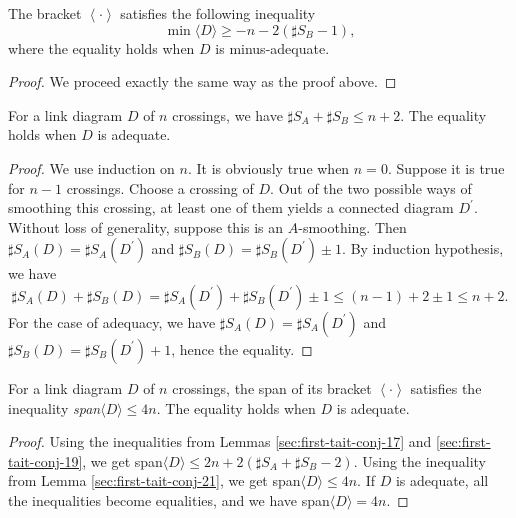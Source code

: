 \begin{lemma}
\label{sec:first-tait-conj-19}
The bracket $\left< \cdot \right>$ satisfies the following inequality
\begin{displaymath}
\min \langle D \rangle \geq -n - 2(\sharp S_B - 1),
\end{displaymath}
where the equality holds when $D$ is minus-adequate.
\end{lemma}

\begin{proof}
\label{sec:first-tait-conj-20}
We proceed exactly the same way as the proof above.
\end{proof}

\begin{lemma}
\label{sec:first-tait-conj-21}
For a link diagram $D$ of $n$ crossings, we have $\sharp S_A + \sharp S_B \leq n+2$. The equality holds when $D$ is adequate.
\end{lemma}

\begin{proof}
\label{sec:first-tait-conj-22}
We use induction on $n$. It is obviously true when $n=0$. Suppose it is true for $n-1$ crossings. Choose a crossing of $D$. Out of the two possible ways of smoothing this crossing, at least one of them yields a connected diagram $D^{\prime}$. Without loss of generality, suppose this is an $A$-smoothing. Then $\sharp S_A(D) = \sharp S_A(D^{\prime})$ and $\sharp S_B(D) = \sharp S_B (D^{\prime}) \pm 1$. By induction hypothesis, we have 
\begin{displaymath}
\sharp S_A(D) + \sharp S_B(D) = \sharp S_A(D^{\prime}) + \sharp S_B(D^{\prime}) \pm 1 \leq (n-1) + 2 \pm 1 \leq n + 2.
\end{displaymath}
For the case of adequacy, we have $\sharp S_A(D) = \sharp S_A(D^{\prime})$ and $\sharp S_B(D) = \sharp S_B (D^{\prime}) + 1$, hence the equality.
\end{proof}


\begin{lemma}
\label{sec:first-tait-conj-7}
For a link diagram $D$ of $n$ crossings, the span of its bracket $\left< \cdot \right>$ satisfies the inequality \emph{span}$\langle D \rangle \leq 4n$. The equality holds when $D$ is adequate.
\end{lemma}

\begin{proof}
\label{sec:first-tait-conj-8}
Using the inequalities from Lemmas \ref{sec:first-tait-conj-17} and \ref{sec:first-tait-conj-19}, we get span$\langle D \rangle \leq 2n + 2(\sharp S_A + \sharp S_B- 2) $. Using the inequality from Lemma \ref{sec:first-tait-conj-21}, we get span$\langle D \rangle \leq 4n$. If $D$ is adequate, all the inequalities become equalities, and we have span$\langle D \rangle = 4n$.
\end{proof}


